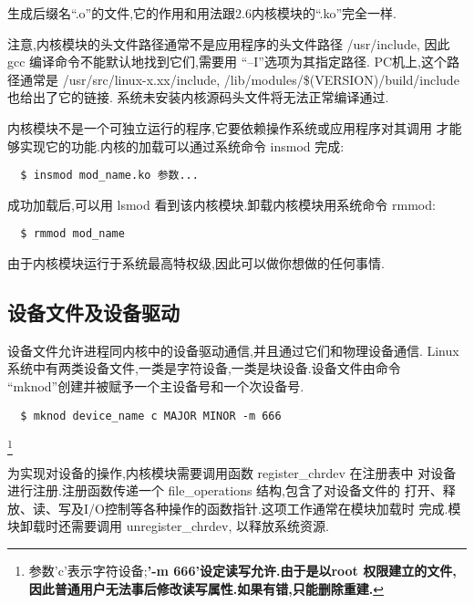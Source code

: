 生成后缀名``.o''的文件,它的作用和用法跟2.6内核模块的``.ko''完全一样.

	注意,内核模块的头文件路径通常不是应用程序的头文件路径 /usr/include,
因此 gcc 编译命令不能默认地找到它们,需要用 ``--I''选项为其指定路径.
PC机上,这个路径通常是 /usr/src/linux-x.xx/include,
/lib/modules/\$(VERSION)/build/include也给出了它的链接.
系统未安装内核源码头文件将无法正常编译通过.

	内核模块不是一个可独立运行的程序,它要依赖操作系统或应用程序对其调用
才能够实现它的功能.内核的加载可以通过系统命令 insmod 完成:

\begin{boxedminipage}{.9\textwidth}
\begin{verbatim}
  $ insmod mod_name.ko 参数...
\end{verbatim}
\end{boxedminipage}

	成功加载后,可以用 lsmod 看到该内核模块.卸载内核模块用系统命令 rmmod:

\begin{boxedminipage}{.9\textwidth}
\begin{verbatim}
  $ rmmod mod_name
\end{verbatim}
\end{boxedminipage}

    由于内核模块运行于系统最高特权级,因此可以做你想做的任何事情.
\subsection{设备文件及设备驱动}
    设备文件允许进程同内核中的设备驱动通信,并且通过它们和物理设备通信.
Linux 系统中有两类设备文件,一类是字符设备,一类是块设备.设备文件由命令
``mknod''创建并被赋予一个主设备号和一个次设备号.

\begin{boxedminipage}{.9\textwidth}
\begin{verbatim}
  $ mknod device_name c MAJOR MINOR -m 666
\end{verbatim}
\end{boxedminipage}
\footnote{参数'c'表示字符设备;{\bf '-m 666'设定读写允许.由于是以root
权限建立的文件,因此普通用户无法事后修改读写属性.如果有错,只能删除重建.}}

    为实现对设备的操作,内核模块需要调用函数 register\_chrdev 在注册表中
对设备进行注册.注册函数传递一个 file\_operations 结构,包含了对设备文件的
打开、释放、读、写及I/O控制等各种操作的函数指针.这项工作通常在模块加载时
完成.模块卸载时还需要调用 unregister\_chrdev, 以释放系统资源.

